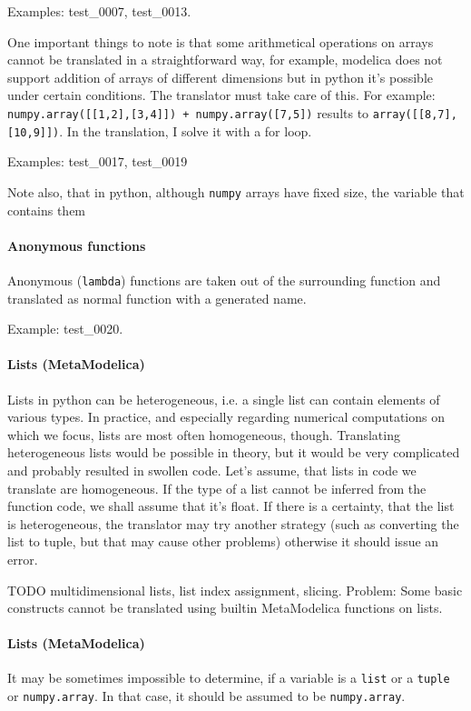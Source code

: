 \documentclass[a4paper,10pt]{article}
\begin{document}
Examples: test\_0007, test\_0013.

One important things to note is that some arithmetical operations on arrays cannot be translated in a straightforward 
way, for example, modelica does not support addition of arrays of different dimensions but in python it's possible
under certain conditions. The translator must take care of this. For example: {\tt numpy.array([[1,2],[3,4]]) + numpy.array([7,5])}
results to {\tt array([[8,7],[10,9]])}. In the translation, I solve it with a for loop. 

Examples: test\_0017, test\_0019

Note also, that in python, although {\tt numpy} arrays have fixed size, the variable that contains them 

\paragraph{Anonymous functions}
Anonymous ({\tt lambda}) functions are taken out of the surrounding function and translated as normal function with a generated name.

Example: test\_0020.

\paragraph{Lists (MetaModelica)} Lists in python can be heterogeneous, i.e. a single list can contain elements of various types.
In practice, and especially regarding numerical computations on which we focus, lists are most often homogeneous, though.
Translating heterogeneous lists would be possible in theory, but it would be very complicated and probably resulted in
swollen code. Let's assume, that lists in code we translate are homogeneous. If the type of a list cannot be inferred from
the function code, we shall assume that it's float. If there is a certainty, that the list is heterogeneous, the translator
may try another strategy (such as converting the list to tuple, but that may cause other problems) otherwise it should
issue an error.


TODO multidimensional lists, list index assignment, slicing. Problem: Some basic constructs cannot be translated using builtin MetaModelica
functions on lists.

\paragraph{Lists (MetaModelica)} 
It may be sometimes impossible to determine, if a variable is a {\tt list} or a {\tt tuple} or {\tt numpy.array}. In that case,
it should be assumed to be {\tt numpy.array}.
\end{document}
